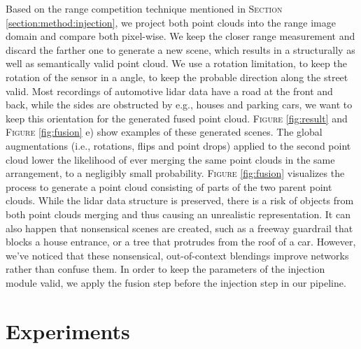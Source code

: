 \documentclass[letterpaper, 10 pt, conference]{ieeeconf}
\begin{document}
Based on the range competition technique mentioned in \textsc{Section} \ref{section:method:injection}, we project both point clouds into the range image domain and compare both pixel-wise. We keep the closer range measurement and discard the farther one to generate a new scene, which results in a structurally as well as semantically valid point cloud.
We use a rotation limitation, to keep the rotation of the sensor in a  angle, to keep the probable direction along the street valid. Most recordings of automotive lidar data have a road at the front and back, while the sides are obstructed by e.g., houses and parking cars, we want to keep this orientation for the generated fused point cloud. \textsc{Figure} \ref{fig:result}  and \textsc{Figure} \ref{fig:fusion} e) show examples of these generated scenes. The global augmentations (i.e., rotations, flips and point drops) applied to the second point cloud lower the likelihood of ever merging the same point clouds in the same arrangement, to a negligibly small probability. \textsc{Figure} \ref{fig:fusion} visualizes the process to generate a point cloud consisting of parts of the two parent point clouds. While the lidar data structure is preserved, there is a risk of objects from both point clouds merging and thus causing an unrealistic representation. It can also happen that nonsensical scenes are created, such as a freeway guardrail that blocks a house entrance, or a tree that protrudes from the roof of a car. However, we've noticed that these nonsensical, out-of-context blendings improve networks rather than confuse them.
In order to keep the parameters of the injection module valid, we apply the fusion step before the injection step in our pipeline.



\section{Experiments}
\label{section:experiments}
\end{document}
